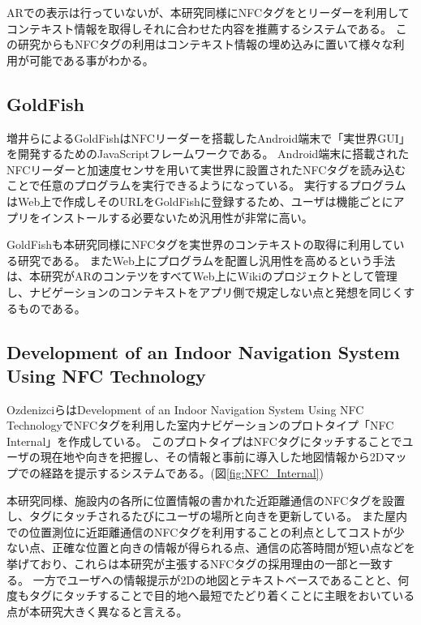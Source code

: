 ARでの表示は行っていないが、本研究同様にNFCタグをとリーダーを利用してコンテキスト情報を取得しそれに合わせた内容を推薦するシステムである。
この研究からもNFCタグの利用はコンテキスト情報の埋め込みに置いて様々な利用が可能である事がわかる。


\subsection{GoldFish}
増井らによるGoldFish\cite{10.1145/2407696.2407699}はNFCリーダーを搭載したAndroid端末で「実世界GUI」を開発するためのJavaScriptフレームワークである。
Android端末に搭載されたNFCリーダーと加速度センサを用いて実世界に設置されたNFCタグを読み込むことで任意のプログラムを実行できるようになっている。
実行するプログラムはWeb上で作成しそのURLをGoldFishに登録するため、ユーザは機能ごとにアプリをインストールする必要ないため汎用性が非常に高い。

GoldFishも本研究同様にNFCタグを実世界のコンテキストの取得に利用している研究である。
またWeb上にプログラムを配置し汎用性を高めるという手法は、本研究がARのコンテツをすべてWeb上にWikiのプロジェクトとして管理し、ナビゲーションのコンテキストをアプリ側で規定しない点と発想を同じくするものである。

\subsection{Development of an Indoor Navigation System Using NFC Technology}
OzdenizciらはDevelopment of an Indoor Navigation System Using NFC Technology\cite{5954491}でNFCタグを利用した室内ナビゲーションのプロトタイプ「NFC Internal」を作成している。
このプロトタイプはNFCタグにタッチすることでユーザの現在地や向きを把握し、その情報と事前に導入した地図情報から2Dマップでの経路を提示するシステムである。(図\ref{fig:NFC_Internal})

本研究同様、施設内の各所に位置情報の書かれた近距離通信のNFCタグを設置し、タグにタッチされるたびにユーザの場所と向きを更新している。
また屋内での位置測位に近距離通信のNFCタグを利用することの利点としてコストが少ない点、正確な位置と向きの情報が得られる点、通信の応答時間が短い点などを挙げており、これらは本研究が主張するNFCタグの採用理由の一部と一致する。
一方でユーザへの情報提示が2Dの地図とテキストベースであることと、何度もタグにタッチすることで目的地へ最短でたどり着くことに主眼をおいている点が本研究大きく異なると言える。

